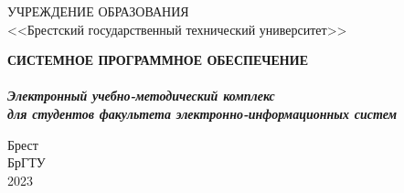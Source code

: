 \documentclass[12pt, a4paper]{book}%
\begin{document}
\large%
\begin{center}%
  УЧРЕЖДЕНИЕ ОБРАЗОВАНИЯ\\
  <<Брестский государственный технический университет>>
\end{center}%
\vspace{20mm}%
\begin{center}%
\textbf{%
     {\LARGE \color{red} СИСТЕМНОЕ ПРОГРАММНОЕ ОБЕСПЕЧЕНИЕ}\\[10mm]%
    \\[10mm]%
    {\it\Large Электронный учебно-методический комплекс }\\%
    {\it\Large для студентов факультета электронно-информационных систем}%
}
\end{center}%
\vspace{30mm}%
\begin{center}%
Брест\\%
БрГТУ\\%
  2023%
\end{center}%
\end{document}

